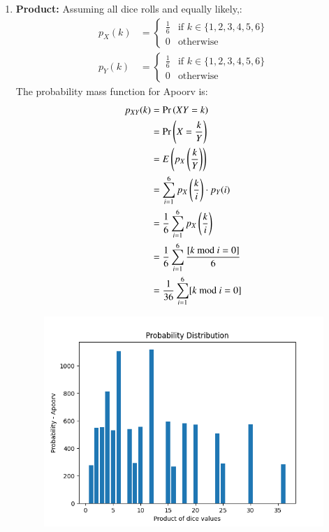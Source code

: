\documentclass[journal,12pt,twocolumn]{IEEEtran}
\theoremstyle{remark}
\begin{document}
\begin{enumerate}
    \item \textbf{Product:} Assuming all dice rolls and equally likely,:
\begin{align}
    p_X(k) &= 
    \begin{cases}
        \frac{1}{6} & \text{if }k \in \{1, 2, 3, 4, 5, 6\}\\
        0 & \text{otherwise}
    \end{cases}\label{eq:1}\\
    p_Y(k) &=
    \begin{cases}
        \frac{1}{6} & \text{if }k \in \{1, 2, 3, 4, 5, 6\}\\
        0 & \text{otherwise}
    \end{cases}
\end{align}
The probability mass function for Apoorv is:
\begin{align}
    p_{XY}(k) &= \Pr\left(XY = k\right)\\
    &= \Pr\left(X = \frac{k}{Y}\right)\\
    &= E\left(p_X\left(\frac{k}{Y}\right)\right)\\
    &= \sum_{i = 1}^{6} p_X\left(\frac{k}{i}\right) \cdot p_Y(i)\\
    &= \frac{1}{6} \sum_{i = 1}^{6} p_X\left(\frac{k}{i}\right)\\
    &= \frac{1}{6} \sum_{i = 1}^{6} \frac{[k \text{ mod } i = 0]}{6}\\
    &= \frac{1}{36} \sum_{i = 1}^{6} [k \text{ mod } i = 0]
\end{align}
\begin{figure}[h!]
    \includegraphics[width=\columnwidth]{plots/PDF - Apoorv.png}

\end{figure}
\end{enumerate}
\end{document}
